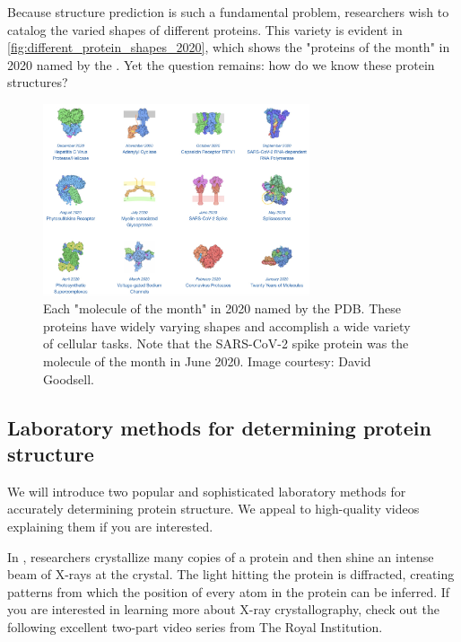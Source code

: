 Because structure prediction is such a fundamental problem, researchers wish to catalog the varied shapes of different proteins. This variety is evident in \autoref{fig:different_protein_shapes_2020}, which shows the "proteins of the month" in 2020 named by the . Yet the question remains: how do we know these protein structures?

\begin{figure}[h]
	\centering
	\mySfFamily
	\includegraphics[width = 0.7\textwidth]{../images/different_protein_shapes_2020.jpg}
	\caption{Each "molecule of the month" in 2020 named by the PDB. These proteins have widely varying shapes and accomplish a wide variety of cellular tasks. Note that the SARS-CoV-2 spike protein was the molecule of the month in June 2020. Image courtesy: David Goodsell.}
	\label{fig:different_protein_shapes_2020}
\end{figure}

\FloatBarrier
{}
\subsection{Laboratory methods for determining protein structure}

We will introduce two popular and sophisticated laboratory methods for accurately determining protein structure. We appeal to high-quality videos explaining them if you are interested.

In , researchers crystallize many copies of a protein and then shine an intense beam of X-rays at the crystal. The light hitting the protein is diffracted, creating patterns from which the position of every atom in the protein can be inferred. If you are interested in learning more about X-ray crystallography, check out the following excellent two-part video series from The Royal Institution.

